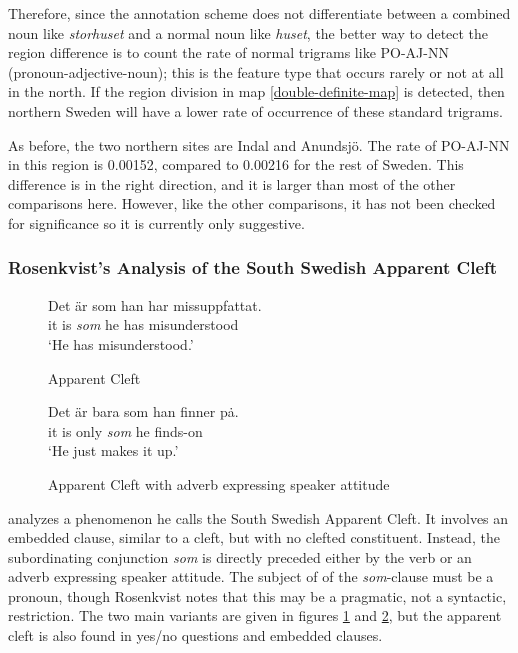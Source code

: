 Therefore, since the annotation scheme does not differentiate between
a combined noun like {\it storhuset} and a normal noun like {\it
  huset}, the better way to detect the region difference is to count
the rate of normal trigrams like PO-AJ-NN (pronoun-adjective-noun);
this is the feature type that occurs rarely or not at all in the
north. If the region division in map \ref{double-definite-map} is
detected, then northern Sweden will have a lower rate of occurrence of
these standard trigrams.

As before, the two northern sites are Indal and Anundsj\"o. The rate
of PO-AJ-NN in this region is 0.00152, compared to 0.00216 for the
rest of Sweden. This difference is in the right direction, and it is
larger than most of the other comparisons here. However, like the
other comparisons, it has not been checked for significance so it is
currently only suggestive.

\subsubsection{Rosenkvist's Analysis of the South Swedish Apparent Cleft}

\begin{figure}
 \gll Det \"ar som han har missuppfattat. \\
  it is {\it som} he has misunderstood \\
  \trans `He has misunderstood.'
  \caption{Apparent Cleft}
  \label{apparent-cleft-example1}
\end{figure}

\begin{figure}
 \gll Det \"ar bara som han finner p\.a. \\
  it is only {\it som} he finds-on \\
  \trans `He just makes it up.'
  \caption{Apparent Cleft with adverb expressing speaker attitude}
  \label{apparent-cleft-example2}
\end{figure}


 analyzes a phenomenon he calls the South
Swedish Apparent Cleft. It involves an embedded clause, similar to a
cleft, but with no clefted constituent. Instead, the subordinating
conjunction {\it som} is directly preceded either by the verb or an
adverb expressing speaker attitude. The subject of of the {\it
  som}-clause must be a pronoun, though Rosenkvist notes that this may
be a pragmatic, not a syntactic, restriction. The two main variants
are given in figures \ref{apparent-cleft-example1} and
\ref{apparent-cleft-example2}, but the apparent cleft is also found in
yes/no questions and embedded clauses.


